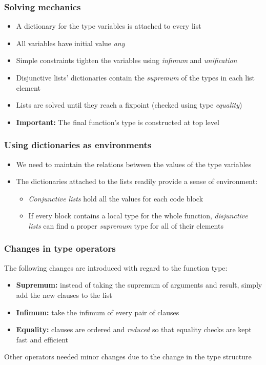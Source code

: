 \documentclass{beamer}
\begin{document}
\begin{frame}
  \frametitle{Solving mechanics}
  \begin{itemize}
  \item A dictionary for the type variables is attached to every
    list
  \item All variables have initial value \emph{any} \pause
  \item Simple constraints tighten the variables using \emph{infimum}
    and \emph{unification} \pause
  \item Disjunctive lists' dictionaries contain the \emph{supremum} of
    the types in each list element \pause
  \item Lists are solved until they reach a fixpoint (checked using
    type \emph{equality}) \pause
  \item \textbf{Important:} The final function's type is constructed
    at top level
  \end{itemize}
\end{frame}

\begin{frame}
  \frametitle{Using dictionaries as environments}
  \begin{itemize}
    \item We need to maintain the relations between the values of the
      type variables \pause
    \item The dictionaries attached to the lists readily provide a
      sense of environment: \pause
      \begin{itemize}
      \item \emph{Conjunctive lists} hold all the values for each code
        block \pause
      \item If every block contains a local type for the whole
        function, \emph{disjunctive lists} can find a proper
        \emph{supremum} type for all of their elements
      \end{itemize}
  \end{itemize}
\end{frame}

\begin{frame}
  \frametitle{Changes in type operators} 
  The following changes are introduced with regard to the function
  type: \pause
  \begin{itemize}
  \item \textbf{Supremum:} instead of taking the supremum of arguments
    and result, simply add the new clauses to the list \pause
  \item \textbf{Infimum:} take the infimum of every pair of clauses
    \pause
  \item \textbf{Equality:} clauses are ordered and \emph{reduced} so
    that equality checks are kept fast and efficient
  \end{itemize} 
  Other operators needed minor changes due to the change in the type
  structure
\end{frame}
\end{document}
